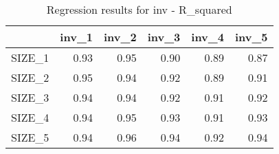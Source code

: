 \begin{table}[ht]
\centering
\caption{Regression results for inv - R_squared} 
\begin{tabular}{rrrrrr}
  \hline
 & inv\_1 & inv\_2 & inv\_3 & inv\_4 & inv\_5 \\ 
  \hline
SIZE\_1 & 0.93 & 0.95 & 0.90 & 0.89 & 0.87 \\ 
  SIZE\_2 & 0.95 & 0.94 & 0.92 & 0.89 & 0.91 \\ 
  SIZE\_3 & 0.94 & 0.94 & 0.92 & 0.91 & 0.92 \\ 
  SIZE\_4 & 0.94 & 0.95 & 0.93 & 0.91 & 0.93 \\ 
  SIZE\_5 & 0.94 & 0.96 & 0.94 & 0.92 & 0.94 \\ 
   \hline
\end{tabular}
\end{table}


